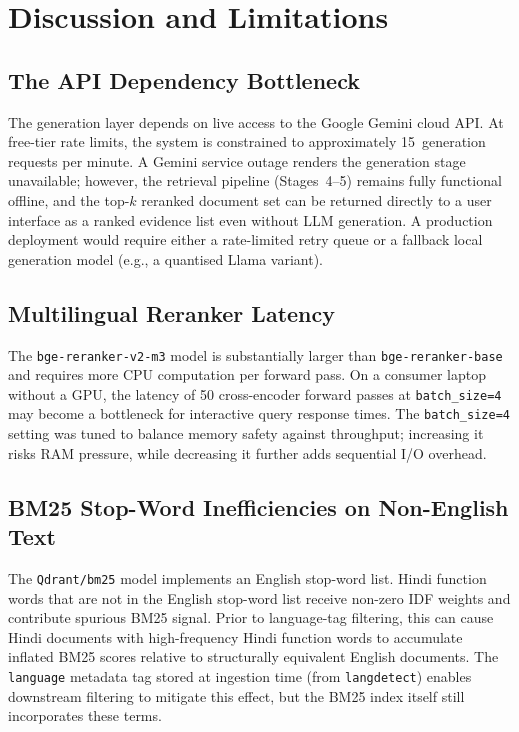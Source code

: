 \documentclass[conference]{IEEEtran}
\begin{document}
\section{Discussion and Limitations}
\label{sec:discussion}

\subsection{The API Dependency Bottleneck}

The generation layer depends on live access to the Google Gemini cloud API.
At free-tier rate limits, the system is constrained to approximately
15~generation requests per minute.
A Gemini service outage renders the generation stage unavailable; however,
the retrieval pipeline (Stages~4--5) remains fully functional offline, and
the top-$k$ reranked document set can be returned directly to a user
interface as a ranked evidence list even without LLM generation.
A production deployment would require either a rate-limited retry queue or
a fallback local generation model (e.g., a quantised Llama variant).

\subsection{Multilingual Reranker Latency}

The \texttt{bge-reranker-v2-m3} model is substantially larger than
\texttt{bge-reranker-base} and requires more CPU computation per forward
pass.
On a consumer laptop without a GPU, the latency of 50 cross-encoder forward
passes at \texttt{batch\_size=4} may become a bottleneck for interactive
query response times.
The \texttt{batch\_size=4} setting was tuned to balance memory safety against
throughput; increasing it risks RAM pressure, while decreasing it further
adds sequential I/O overhead.

\subsection{BM25 Stop-Word Inefficiencies on Non-English Text}

The \texttt{Qdrant/bm25} model implements an English stop-word list.
Hindi function words that are not in the English stop-word list receive
non-zero IDF weights and contribute spurious BM25 signal.
Prior to language-tag filtering, this can cause Hindi documents with
high-frequency Hindi function words to accumulate inflated BM25 scores
relative to structurally equivalent English documents.
The \texttt{language} metadata tag stored at ingestion time (from
\texttt{langdetect}) enables downstream filtering to mitigate this
effect, but the BM25 index itself still incorporates these terms.
\end{document}
